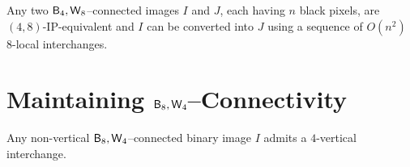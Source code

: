 \documentclass[lotsofwhite,charterfonts]{patmorin}
\newcommand{\foureight}{\ensuremath{\protect\textup{\textsf{B}}_{4},\protect\textup{\textsf{W}}_{8}}}
\newcommand{\eightfour}{\ensuremath{\protect\textup{\textsf{B}}_{8},\protect\textup{\textsf{W}}_{4}}}
\begin{document}
\begin{thm}
Any two \foureight--connected images $I$ and $J$, each having $n$ black
pixels, are $(4,8)$-IP-equivalent and $I$ can be converted into $J$ using a
sequence of $O(n^2)$ 8-local interchanges.
\end{thm}
 



\section{Maintaining \eightfour--Connectivity}


\begin{lem}
Any  non-vertical $\eightfour$--connected binary image $I$ admits a $4$-vertical interchange.
\end{lem}
\end{document}
